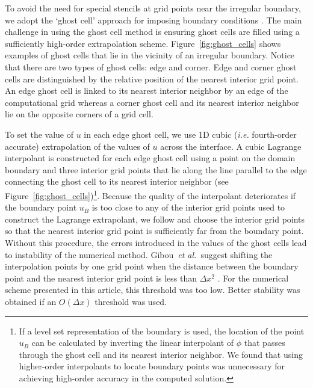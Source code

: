 \documentclass[fleqn,12pt,twoside]{article}
\def\dx{\Delta x}
\def\ie{\emph{i.e. }}
\def\etal{\emph{et al.}}
\begin{document}
To avoid the need for special stencils at grid points near the irregular 
boundary, we adopt the `ghost cell' approach for imposing boundary 
conditions \cite{gibou_2005,ito_2005,fedkiw_1999,osher_fedkiw_book}.
The main challenge in using the ghost cell method is ensuring ghost cells 
are filled using a sufficiently high-order extrapolation scheme. 
Figure~\ref{fig:ghost_cells} shows examples of ghost cells that lie in the 
vicinity of an irregular boundary.  Notice that there are two types of ghost 
cells:  edge and corner.  Edge and corner ghost cells are distinguished by 
the relative position of the nearest interior grid point.  An edge ghost cell 
is linked to its nearest interior neighbor by an edge of the computational 
grid whereas a corner ghost cell and its nearest interior neighbor lie on the 
opposite corners of a grid cell.

To set the value of $u$ in each edge ghost cell, we use 1D cubic 
(\ie fourth-order accurate) extrapolation of the values of $u$ across the 
interface.  A cubic Lagrange interpolant is constructed for each edge ghost 
cell using a point on the domain boundary and three interior grid points that 
lie along the line parallel to the edge connecting the ghost cell to its 
nearest interior neighbor (see Figure~\ref{fig:ghost_cells})\footnote{If
a level set representation of the boundary \cite{osher_fedkiw_book} is used, 
the location of the point $u_B$ can be calculated by inverting the linear 
interpolant of $\phi$ that passes through the ghost cell and its nearest
interior neighbor.  We found that using higher-order interpolants to 
locate boundary points was unnecessary for achieving high-order accuracy in 
the computed solution.}.  Because the quality of the interpolant deteriorates 
if the boundary point $u_B$ is too close to any of the interior grid points 
used to construct the Lagrange extrapolant, we follow \cite{gibou_2005} and 
choose the interior grid points so that the nearest interior grid point is 
sufficiently far from the boundary point.  Without this procedure, the errors 
introduced in the values of the ghost cells lead to instability of the 
numerical method.
Gibou~\etal~suggest shifting the interpolation points by one grid point 
when the distance between the boundary point and the nearest interior grid 
point is less than $\dx^2$ \cite{gibou_2005}.  For the numerical scheme 
presented in this article, this threshold was too low.  Better stability was 
obtained if an $O(\dx)$ threshold was used.
\end{document}
